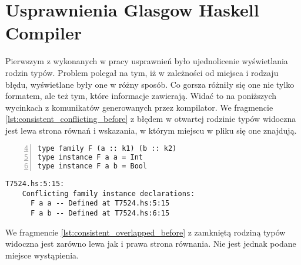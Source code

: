\chapter{Usprawnienia Glasgow Haskell Compiler}\label{chap:badania}

\label{sec:zgloszenie_10839}

Pierwszym z wykonanych w pracy usprawnień było ujednolicenie wyświetlania rodzin typów. Problem polegał na tym, iż w zależności od miejsca i rodzaju błędu, wyświetlane były one w różny sposób. Co gorsza różniły się one nie tylko formatem, ale też tym, które informacje zawierają. Widać to na poniższych wycinkach z komunikatów generowanych przez kompilator. We fragmencie \ref{lst:consistent_conflicting_before} z błędem w otwartej rodzinie typów widoczna jest lewa strona równań i wskazania, w którym miejscu w pliku się one znajdują.

\begin{lstlisting}[numbers=left,firstnumber=4,label={lst:consistent_conflicting_code},
                   caption={Fragment testu T7524 z dwoma równaniami otwartej rodziny typów będącymi w konflikcie.}]
type family F (a :: k1) (b :: k2)
type instance F a a = Int
type instance F a b = Bool
\end{lstlisting}

\begin{lstlisting}[language={},label={lst:consistent_conflicting_before},
                   caption={Błąd generowany przez kompilator w przypadku \ref{lst:consistent_conflicting_code} przed wprowadzeniem zmian.}]
T7524.hs:5:15:
    Conflicting family instance declarations:
      F a a -- Defined at T7524.hs:5:15
      F a b -- Defined at T7524.hs:6:15
\end{lstlisting}

We fragmencie \ref{lst:consistent_overlapped_before} z zamkniętą rodziną typów widoczna jest zarówno lewa jak i prawa strona równania. Nie jest jednak podane miejsce wystąpienia.

